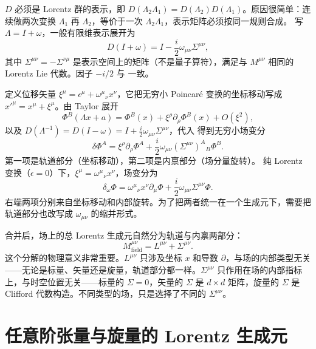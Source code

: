 $D$ 必须是 Lorentz 群的表示，即 $D(\Lambda_2\Lambda_1)=D(\Lambda_2)D(\Lambda_1)$。原因很简单：连续做两次变换 $\Lambda_1$ 再 $\Lambda_2$，等价于一次 $\Lambda_2\Lambda_1$，表示矩阵必须按同一规则合成。
写 $\Lambda=I+\omega$，一般有限维表示展开为
\begin{equation}\label{eq:ms-poincare-D-expand}
D(I+\omega)=I-\frac{i}{2}\omega_{\mu\nu}\Sigma^{\mu\nu},
\end{equation}
其中 $\Sigma^{\mu\nu}=-\Sigma^{\nu\mu}$ 是表示空间上的矩阵（不是量子算符），满足与 $M^{\mu\nu}$ 相同的 Lorentz Lie 代数。因子 $-i/2$ 与 一致。

定义位移矢量 $\xi^\mu=\epsilon^\mu+\omega^\mu{}_\nu x^\nu$，它把无穷小 Poincaré 变换的坐标移动写成 $x'^\mu=x^\mu+\xi^\mu$。由 Taylor 展开
\begin{equation*}
\Phi^B(\Lambda x+a)=\Phi^B(x)+\xi^\rho\partial_\rho\Phi^B(x)+O(\xi^2),
\end{equation*}
以及 $D(\Lambda^{-1})=D(I-\omega)=I+\frac{i}{2}\omega_{\mu\nu}\Sigma^{\mu\nu}$，代入 得到无穷小场变分
\begin{equation}\label{eq:ms-poincare-delta-Phi}
\boxed{
\delta\Phi^A=\xi^\rho\partial_\rho\Phi^A+\frac{i}{2}\omega_{\mu\nu}(\Sigma^{\mu\nu})^A{}_B\Phi^B.
}
\end{equation}
第一项是轨道部分（坐标移动），第二项是内禀部分（场分量旋转）。
纯 Lorentz 变换（$\epsilon=0$）下，$\xi^\mu=\omega^\mu{}_\nu x^\nu$，场变分为
\begin{equation*}
\delta_\omega\Phi=\omega^\mu{}_\nu x^\nu\partial_\mu\Phi+\frac{i}{2}\omega_{\mu\nu}\Sigma^{\mu\nu}\Phi.
\end{equation*}
右端两项分别来自坐标移动和内部旋转。为了把两者统一在一个生成元下，需要把轨道部分也改写成 $\omega_{\mu\nu}$ 的缩并形式。

合并后，场上的总 Lorentz 生成元自然分为轨道与内禀两部分：
\begin{equation*}\boxed{M^{\mu\nu}_{\text{field}}=L^{\mu\nu}+\Sigma^{\mu\nu}.}
\end{equation*}
这个分解的物理意义非常重要。$L^{\mu\nu}$ 只涉及坐标 $x$ 和导数 $\partial$，与场的内部类型无关——无论是标量、矢量还是旋量，轨道部分都一样。$\Sigma^{\mu\nu}$ 只作用在场的内部指标上，与时空位置无关——标量的 $\Sigma=0$，矢量的 $\Sigma$ 是 $d\times d$ 矩阵，旋量的 $\Sigma$ 是 Clifford 代数构造。不同类型的场，只是选择了不同的 $\Sigma^{\mu\nu}$。

\section{任意阶张量与旋量的 Lorentz 生成元}

